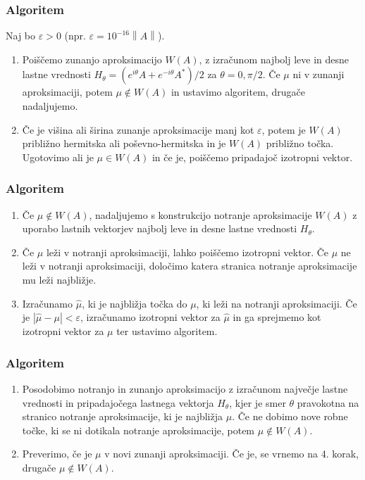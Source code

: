 \documentclass{beamer}
\newcommand{\abs}[1]{ \left\lvert#1\right\rvert}
\newcommand{\norm}[1]{\left\lVert#1\right\rVert}
\newcounter{saveenumi}
\newcommand{\seti}{\setcounter{saveenumi}{\value{enumi}}}
\newcommand{\conti}{\setcounter{enumi}{\value{saveenumi}}}
\begin{document}
\begin{frame}
\frametitle{Algoritem}
Naj bo $\varepsilon >0$ (npr. $\varepsilon=10^{-16}\norm{A}$). 
\begin{enumerate}[1.]
\item Poiščemo zunanjo aproksimacijo $W(A)$, z izračunom najbolj leve in desne lastne vrednosti $H_\theta =(e^{i\theta}A+e^{-i\theta}A^\ast)/2$ za $\theta =0, \pi/2$. %
Če $\mu$ ni v zunanji aproksimaciji, potem $\mu \not \in W(A)$ in ustavimo algoritem, drugače nadaljujemo.\medskip
\item Če je višina ali širina zunanje aproksimacije manj kot $\varepsilon$, potem je $W(A)$ približno hermitska ali poševno-hermitska in je $W(A)$ približno točka. Ugotovimo ali je $\mu \in W(A)$ in če je, poiščemo pripadajoč izotropni vektor. 
\seti
\end{enumerate}
\end{frame}
\begin{frame}
\frametitle{Algoritem}
\begin{enumerate}[1.]
\conti
\item Če $\mu \not \in W(A)$, nadaljujemo s konstrukcijo notranje aproksimacije $W(A)$ z uporabo lastnih vektorjev najbolj leve in desne lastne vrednosti $H_{\theta}$.\medskip%
\item  Če $\mu$ leži v notranji aproksimaciji, lahko poiščemo izotropni vektor. %
Če $\mu$ ne leži v notranji aproksimaciji, določimo katera stranica notranje aproksimacije mu leži najbližje.\medskip
\item  Izračunamo $\hat{\mu}$, ki je najbližja točka do $\mu$, ki leži na notranji aproksimaciji. Če je $\abs{\hat{\mu}-\mu}<\varepsilon$, izračunamo izotropni vektor za $\hat{\mu}$ in ga sprejmemo kot izotropni vektor za $\mu$ ter ustavimo algoritem.
\seti
\end{enumerate}
\end{frame}
\begin{frame}
\frametitle{Algoritem}
\begin{enumerate}[1.]
\conti
\item Posodobimo notranjo in zunanjo aproksimacijo z izračunom največje lastne vrednosti in pripadajočega lastnega vektorja $H_{\theta}$, kjer je smer $\theta$ pravokotna na stranico notranje aproksimacije, ki je najbližja $\mu$. Če ne dobimo nove robne točke, ki se ni dotikala notranje aproksimacije, potem $\mu \not \in W(A)$. \medskip
\item Preverimo, če je $\mu$  v novi zunanji aproksimaciji. Če je, se vrnemo na 4. korak, drugače $\mu \not \in W(A)$. 
\end{enumerate}
\end{frame}
\end{document}
